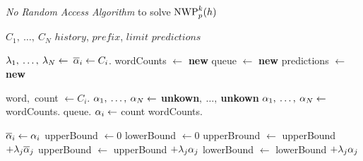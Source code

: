 \begin{algorithm}
  \caption{\emph{No Random Access Algorithm} to solve $\NWP[p][k]{h}$}
  \label{alg:norandomaccessalgorithm}
  \begin{algorithmic}[1]
    \Require $C_1, \: \ldots, \: C_N$
    \Require $history$, $prefix$, $limit$
    \Statex {}
    \Ensure $predictions$

    \State $\lambda_1, \: \ldots, \: \lambda_N \gets$ 
      \label{ln:nra-sumweights}
      \label{ln:nra-bara-for}
      \State $\overline{\alpha}_i \gets C_i$.
        \label{ln:nra-bara-peek}
    \EndFor
    \State wordCounts $\gets$ \textbf{new} 
      \label{ln:nra-wordcounts}
    \State queue $\gets$ \textbf{new} 
      \label{ln:nra-queue}
    \State predictions $\gets$ \textbf{new} 
      \label{ln:nra-predictions}

    \vspace{0.7em}
      \label{ln:nra-while}
      \State word$,$ count $\gets C_i$.
        \label{ln:nra-next}
        \label{ln:nra-contains}
        \State $\alpha_1, \: \ldots, \: \alpha_N \gets $ \textbf{unkown}$, \: \ldots, \:$\textbf{unkown}
          \label{ln:nra-set-unkown}
      \Else
        \State $\alpha_1, \: \ldots, \: \alpha_N \gets $ wordCounts.
          \label{ln:nra-get-wordcounts}
        \State queue.
          \label{ln:nra-queue-remove}
      \EndIf
      \State $\alpha_i \gets$ count
        \label{ln:nra-a-set}
      \State wordCounts.
        \label{ln:nra-update-mapping}

      \vspace{0.7em}
      \State $\overline{\alpha}_i \gets \alpha_i$
        \label{ln:nra-bara-update}
      \State upperBound $\gets 0$
        \label{ln:nra-upperbound-init}
      \State lowerBound $\gets 0$
        \label{ln:nra-lowerbound-init}
          \State upperBround $\gets$ upperBound $+ \lambda_j \overline{\alpha}_j$
            \label{ln:nra-upperbound-unknown}
        \Else
          \State upperBound $\gets$ upperBound $+ \lambda_j \alpha_j$
            \label{ln:nra-upperbound-known}
          \State lowerBound $\gets$ lowerBound $+ \lambda_j \alpha_j$
            \label{ln:nra-lowerbound-known}
        \EndIf
      \EndFor


\end{algorithmic}
\end{algorithm}
